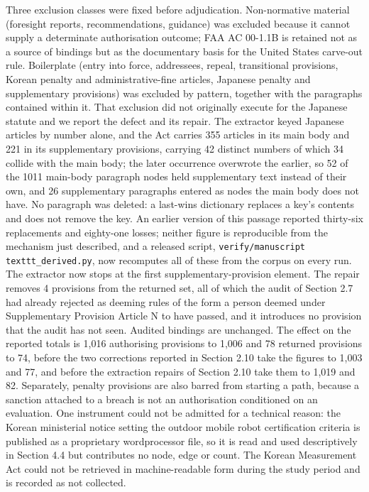 Three exclusion classes were fixed before adjudication. Non-normative material (foresight reports, recommendations, guidance) was excluded because it cannot supply a determinate authorisation outcome; FAA AC 00-1.1B is retained not as a source of bindings but as the documentary basis for the United States carve-out rule. Boilerplate (entry into force, addressees, repeal, transitional provisions, Korean penalty and administrative-fine articles, Japanese penalty and supplementary provisions) was excluded by pattern, together with the paragraphs contained within it. That exclusion did not originally execute for the Japanese statute and we report the defect and its repair. The extractor keyed Japanese articles by number alone, and the Act carries 355 articles in its main body and 221 in its supplementary provisions, carrying 42 distinct numbers of which 34 collide with the main body; the later occurrence overwrote the earlier, so 52 of the 1011 main-body paragraph nodes held supplementary text instead of their own, and 26 supplementary paragraphs entered as nodes the main body does not have. No paragraph was deleted: a last-wins dictionary replaces a key's contents and does not remove the key. An earlier version of this passage reported thirty-six replacements and eighty-one losses; neither figure is reproducible from the mechanism just described, and a released script, \texttt{verify/manuscript\\texttt{\_derived}.py}, now recomputes all of these from the corpus on every run. The extractor now stops at the first supplementary-provision element. The repair removes 4 provisions from the returned set, all of which the audit of Section 2.7 had already rejected as deeming rules of the form a person deemed under Supplementary Provision Article N to have passed, and it introduces no provision that the audit has not seen. Audited bindings are unchanged. The effect on the reported totals is 1,016 authorising provisions to 1,006 and 78 returned provisions to 74, before the two corrections reported in Section 2.10 take the figures to 1,003 and 77, and before the extraction repairs of Section 2.10 take them to 1,019 and 82. Separately, penalty provisions are also barred from starting a path, because a sanction attached to a breach is not an authorisation conditioned on an evaluation. One instrument could not be admitted for a technical reason: the Korean ministerial notice setting the outdoor mobile robot certification criteria is published as a proprietary wordprocessor file, so it is read and used descriptively in Section 4.4 but contributes no node, edge or count. The Korean Measurement Act could not be retrieved in machine-readable form during the study period and is recorded as not collected.

